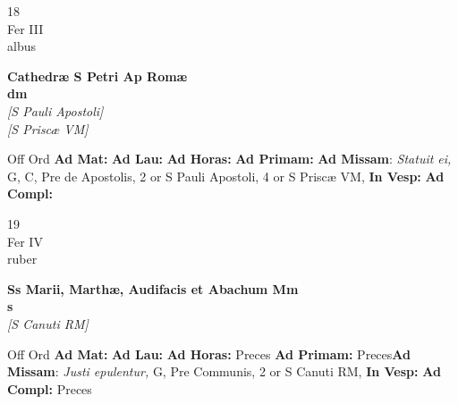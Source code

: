 \documentclass[10pt, openany]{book}
\begin{document}
    \begin{center}
        \begin{minipage}{3.5in}
            \vspace{2em}
            \begin{minipage}{0.5in}
                {\Huge 18} \\
                {\normalsize Fer III} \\
                {\normalsize albus}
            \end{minipage}
            \begin{minipage}{3.0in}
                \textbf{ \large Cathedræ S Petri Ap Romæ \\
                \textnormal{\normalsize dm}} \\ \textit{[S Pauli Apostoli]} \\ \textit{[S Priscæ VM]} \\ 
            \end{minipage}
            \begin{justify}Off Ord
                \textbf{Ad Mat: }
                \textbf{Ad Lau: }
                \textbf{Ad Horas: }
                \textbf{Ad Primam: }\textbf{Ad Missam}: \textit{Statuit ei,} G, C, Pre de Apostolis, 2 or S Pauli Apostoli, 4 or S Priscæ VM,  
                \textbf{In Vesp: }
                \textbf{Ad Compl: }
            \end{justify}
        \end{minipage}
    \end{center}

    \begin{center}
        \begin{minipage}{3.5in}
            \vspace{2em}
            \begin{minipage}{0.5in}
                {\Huge 19} \\
                {\normalsize Fer IV} \\
                {\normalsize ruber}
            \end{minipage}
            \begin{minipage}{3.0in}
                \textbf{ \large Ss Marii, Marthæ, Audifacis et Abachum Mm \\
                \textnormal{\normalsize s}} \\ \textit{[S Canuti RM]} \\ 
            \end{minipage}
            \begin{justify}Off Ord
                \textbf{Ad Mat: }
                \textbf{Ad Lau: }
                \textbf{Ad Horas: }Preces
                \textbf{Ad Primam: }Preces\textbf{Ad Missam}: \textit{Justi epulentur,} G, Pre Communis, 2 or S Canuti RM,  
                \textbf{In Vesp: }
                \textbf{Ad Compl: }Preces
            \end{justify}
        \end{minipage}
    \end{center}
\end{document}
